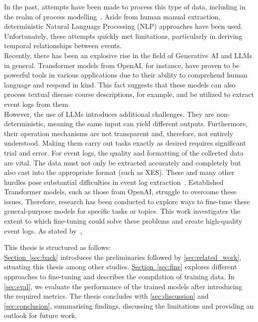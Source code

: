 In the past, attempts have been made to process this type of data, including in the realm of process modelling~\cite{friedrich_process_2011}. Aside from human manual extraction,  deterministic Natural Language Processing (NLP) approaches have been used. Unfortunately, these attempts quickly met limitations, particularly in deriving temporal relationships between events.\\
Recently, there has been an explosive rise in the field of Generative AI and LLMs in general. Transformer models from OpenAI, for instance, have proven to be powerful tools in various applications due to their ability to comprehend human language and respond in kind. This fact suggests that these models can also process textual disease course descriptions, for example, and be utilized to extract event logs from them.\\
However, the use of LLMs introduces additional challenges. They are non-deterministic, meaning the same input can yield different outputs. Furthermore, their operation mechanisms are not transparent and, therefore, not entirely understood. Making them carry out tasks exactly as desired requires significant trial and error. For event logs, the quality and formatting of the collected data are vital. The data must not only be extracted accurately and completely but also cast into the appropriate format (such as XES).
These and many other hurdles pose substantial difficulties in event log extraction~\cite{munoz-gama_process_2022}. Established Transformer models, such as those from OpenAI, struggle to overcome these issues. Therefore, research has been conducted to explore ways to fine-tune these general-purpose models for specific tasks or topics. This work investigates the extent to which fine-tuning could solve these problems and create high-quality event logs. As stated by~\cite{latif_fine-tuning_2024}, 
\begin{quote}
\end{quote}

This thesis is structured as follows:\\
\hyperref[sec:back]{Section~\ref*{sec:back}} introduces the preliminaries followed by \autoref{sec:related_work}, situating this thesis among other studies. \hyperref[sec:fine]{Section~\ref*{sec:fine}} explores different approaches to fine-tuning and describes the compilation of training data. In \autoref{sec:eval}, we evaluate the performance of the trained models after introducing the required metrics. The thesis concludes with \autoref{sec:discussion} and \autoref{sec:conclusion}, summarising findings, discussing the limitations and providing an outlook for future work.
